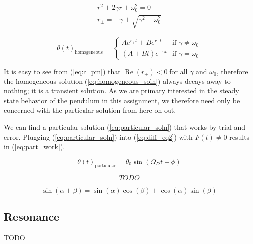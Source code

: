 \documentclass[notitlepage,aps,prd,nofootinbib]{revtex4-1}
\begin{document}
\begin{gather}
r^2 + 2 \gamma r + \omega_{0}^2 = 0 \label{eq:characteristic_eq} \\
r_{\pm} = -\gamma \pm \sqrt{\gamma^2 - \omega_{0}^2} \label{eq:r_pm}
\end{gather}

\begin{equation} \label{eq:homogeneous_soln}
\theta\left(t\right)_{\text{homogeneous}} =
\begin{cases}
A e^{r_{+} t} + B e^{r_{-} t} & \text{if } \gamma \neq \omega_{0} \\
\left(A + B t\right) e^{-\gamma t} & \text{if } \gamma = \omega_{0}
\end{cases}
\end{equation}

It is easy to see from (\ref{eq:r_pm}) that $\operatorname{Re}\left(r_{\pm}\right) < 0$ for all $\gamma$ and $\omega_{0}$, therefore the homogeneous solution (\ref{eq:homogeneous_soln}) always decays away to nothing; it is a transient solution. As we are primary interested in the steady state behavior of the pendulum in this assignment, we therefore need only be concerned with the particular solution from here on out.

We can find a particular solution (\ref{eq:particular_soln}) that works by trial and error. Plugging (\ref{eq:particular_soln}) into (\ref{eq:diff_eq2}) with $F\left(t\right) \neq 0$ results in (\ref{eq:part_work}).

\begin{equation} \label{eq:particular_soln}
\theta\left(t\right)_{\text{particular}} = \theta_{0} \sin\left(\Omega_{D} t - \phi\right)
\end{equation}

\begin{equation} \label{eq:part_work}
TODO
\end{equation}

\begin{equation} \label{eq:trig_identity}
\sin\left(\alpha + \beta\right) = \sin\left(\alpha\right) \cos\left(\beta\right) + \cos\left(\alpha\right) \sin\left(\beta\right)
\end{equation}


\subsection{Resonance}
\label{subsec:resonance}
TODO
\end{document}
